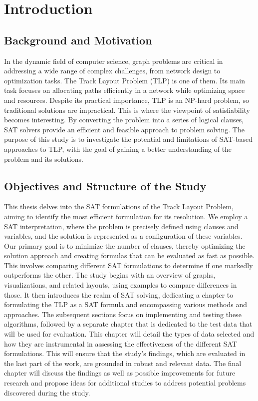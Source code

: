 \documentclass[bachelor, english]{algothesis}
\begin{document}
\thesistableofcontents

\chapter{Introduction}

\section{Background and Motivation}
\frenchspacing
In the dynamic field of computer science, graph problems are critical in addressing a wide range of complex challenges, from network design to optimization tasks. The Track Layout Problem (TLP) is one of them. Its main task focuses on allocating paths efficiently in a network while optimizing space and resources. Despite its practical importance, TLP is an NP-hard problem, so traditional solutions are impractical. This is where the viewpoint of satisfiability becomes interesting. By converting the problem into a series of logical clauses, SAT solvers provide an efficient and feasible approach to problem solving. The purpose of this study is to investigate the potential and limitations of SAT-based approaches to TLP, with the goal of gaining a better understanding of the problem and its solutions.

\section{Objectives and Structure of the Study}
\frenchspacing
This thesis delves into the SAT formulations of the Track Layout Problem, aiming to identify the most efficient formulation for its resolution. We employ a SAT interpretation, where the problem is precisely defined using clauses and variables, and the solution is represented as a configuration of these variables. Our primary goal is to minimize the number of clauses, thereby optimizing the solution approach and creating formulas that can be evaluated as fast as possible. This involves comparing different SAT formulations to determine if one markedly outperforms the other. 
\newline
The study begins with an overview of graphs, visualizations, and related layouts, using examples to compare differences in those. It then introduces the realm of SAT solving, dedicating a chapter to formulating the TLP as a SAT formula and encompassing various methods and approaches. The subsequent sections focus on implementing and testing these algorithms, followed by a separate chapter that is dedicated to the test data that will be used for evaluation. This chapter will detail the types of data selected and how they are instrumental in assessing the effectiveness of the different SAT formulations. This will ensure that the study's findings, which are evaluated in the last part of the work, are grounded in robust and relevant data. The final chapter will discuss the findings as well as possible improvements for future research and propose ideas for additional studies to address potential problems discovered during the study.
\end{document}
